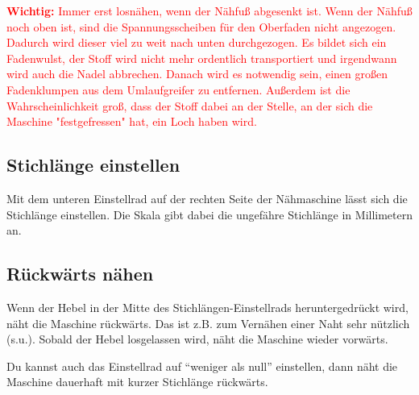 \documentclass{\basedir/fablab-document}
\begin{document}
\textcolor{red}{
	\textbf{Wichtig:} Immer erst losnähen, wenn der Nähfuß abgesenkt ist. Wenn der Nähfuß noch oben ist, sind die Spannungsscheiben für den Oberfaden nicht angezogen. 
	Dadurch wird dieser viel zu weit nach unten durchgezogen. Es bildet sich ein Fadenwulst, der Stoff wird nicht mehr ordentlich transportiert und irgendwann wird auch die Nadel abbrechen. Danach wird es notwendig sein, einen großen Fadenklumpen aus dem Umlaufgreifer zu entfernen. 
	Außerdem ist die Wahrscheinlichkeit groß, dass der Stoff dabei an der Stelle, an der sich die Maschine "festgefressen" hat, ein Loch haben wird.
}

\subsection{Stichlänge einstellen}
Mit dem unteren Einstellrad auf der rechten Seite der Nähmaschine lässt sich die Stichlänge einstellen. Die Skala gibt dabei die ungefähre Stichlänge in Millimetern an.

\subsection{Rückwärts nähen}
Wenn der Hebel in der Mitte des Stichlängen-Einstellrads heruntergedrückt wird, näht die Maschine rückwärts. Das ist z.B. zum Vernähen einer Naht sehr nützlich (s.u.).
Sobald der Hebel losgelassen wird, näht die Maschine wieder vorwärts.

Du kannst auch das Einstellrad auf \enquote{weniger als null} einstellen, dann näht die Maschine dauerhaft mit kurzer Stichlänge rückwärts.
\end{document}
